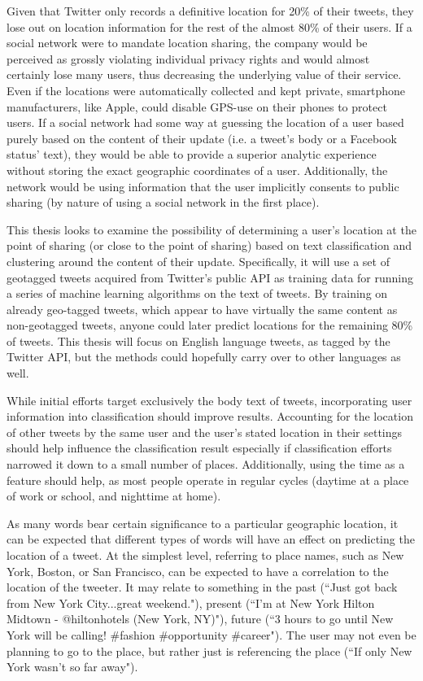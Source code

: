 \documentclass[midd]{thesis}
\begin{document}
Given that Twitter only records a definitive location for 20\% of their tweets, they lose out on location information for the rest of the almost 80\% of their users. If a social network were to mandate location sharing, the company would be perceived as grossly violating individual privacy rights and would almost certainly lose many users, thus decreasing the underlying value of their service. Even if the locations were automatically collected and kept private, smartphone manufacturers, like Apple, could disable GPS-use on their phones to protect users. If a social network had some way at guessing the location of a user based purely based on the content of their update (i.e. a tweet's body or a Facebook status' text), they would be able to provide a superior analytic experience without storing the exact geographic coordinates of a user. Additionally, the network would be using information that the user implicitly consents to public sharing (by nature of using a social network in the first place).

This thesis looks to examine the possibility of determining a user's location at the point of sharing (or close to the point of sharing) based on text classification and clustering around the content of their update. Specifically, it will use a set of geotagged tweets acquired from Twitter's public API as training data for running a series of machine learning algorithms on the text of tweets. By training on already geo-tagged tweets, which appear to have virtually the same content as non-geotagged tweets, anyone could later predict locations for the remaining 80\% of tweets. This thesis will focus on English language tweets, as tagged by the Twitter API, but the methods could hopefully carry over to other languages as well.

While initial efforts target exclusively the body text of tweets, incorporating user information into classification should improve results. Accounting for the location of other tweets by the same user and the user's stated location in their settings should help influence the classification result especially if classification efforts narrowed it down to a small number of places. Additionally, using the time as a feature should help, as most people operate in regular cycles (daytime at a place of work or school, and nighttime at home).

As many words bear certain significance to a particular geographic location, it can be expected that different types of words will have an effect on predicting the location of a tweet. At the simplest level, referring to place names, such as New York, Boston, or San Francisco, can be expected to have a correlation to the location of the tweeter. It may relate to something in the past (``Just got back from New York City...great weekend."), present (``I'm at New York Hilton Midtown - @hiltonhotels (New York, NY)"), future (``3 hours to go until New York will be calling! \#fashion \#opportunity \#career"). The user may not even be planning to go to the place, but rather just is referencing the place (``If only New York wasn't so far away").
\end{document}
